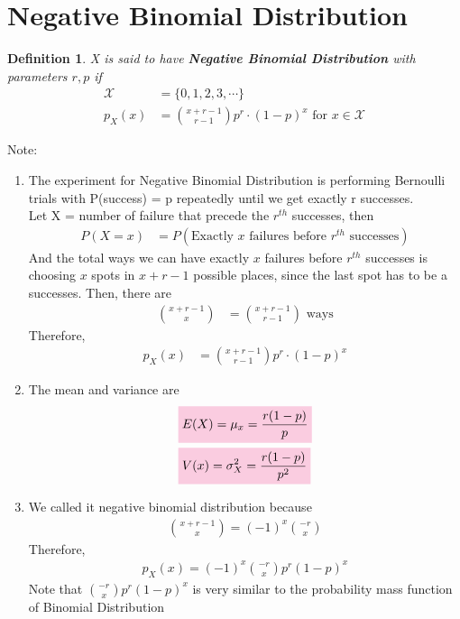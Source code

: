 \documentclass[11pt,oneside]{book}
\theoremstyle{newStyle}
\newtheorem{defn}[thm]{Definition}
\newcommand{\X}{\mathcal{X}}
\newcommand{\note}{\color{red}Note: \color{black}}
\begin{document}
\section[Negative Binomial Distribution]{Negative Binomial Distribution}
\begin{defn}
X is said to have \textbf{Negative Binomial Distribution} with parameters $r,p$ if \begin{align*}
\X&=\{0,1,2,3,\cdots\}\\
p_X(x)&=\binom{x+r-1}{r-1}p^r\cdot (1-p)^x\text{ for }x\in \X
\end{align*}
\end{defn}
\note \begin{enumerate}
\item The experiment for Negative Binomial Distribution is performing Bernoulli trials with P(success) = p repeatedly until we get exactly r successes.\\
Let X = number of failure that precede the $r^{th}$ successes, then \begin{align*}
P(X=x)&=P(\text{Exactly $x$ failures before $r^{th}$ successes})
\end{align*}
And the total ways we can have exactly $x$ failures before $r^{th}$ successes is choosing $x$ spots in $x+r-1$ possible places, since the last spot has to be a successes. Then, there are  \begin{align*}
\binom{x+r-1}{x}&=\binom{x+r-1}{r-1} \text{ ways}
\end{align*}
Therefore, \begin{align*}
p_X(x)&=\binom{x+r-1}{r-1}p^r\cdot (1-p)^x
\end{align*}
\item The mean and variance are \begin{align*}
&\text{\colorbox{pink}{$E(X)=\mu_x=\frac{r(1-p)}{p}$}}\\
&\text{\colorbox{pink}{$V(x)=\sigma_X^2=\frac{r(1-p)}{p^2}$}}
\end{align*}
\item We called it negative binomial distribution because \begin{align*}
\binom{x+r-1}{x}=(-1)^x \binom{-r}{x}
\end{align*}
Therefore, \begin{align*}
p_X(x)=(-1)^x\binom{-r}{x}p^r(1-p)^x
\end{align*}
Note that $\binom{-r}{x}p^r(1-p)^x$ is very similar to the probability mass function of Binomial Distribution
\end{enumerate}
\end{document}
